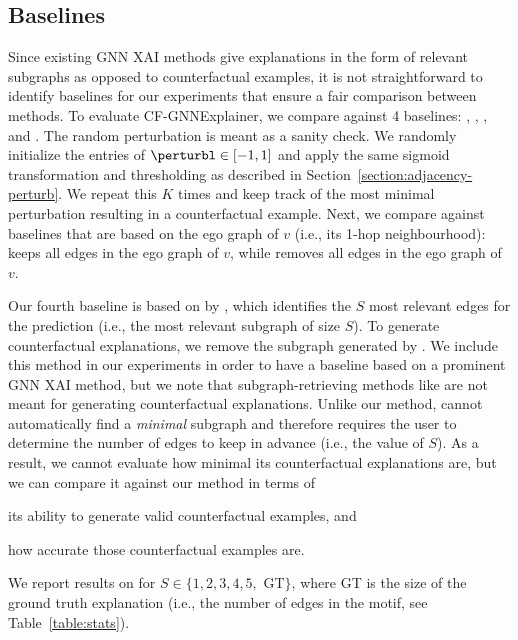 \subsection{Baselines}
\label{section:baselines}
Since existing GNN XAI methods give explanations in the form of relevant subgraphs as opposed to counterfactual examples, it is not straightforward to identify baselines for our experiments that ensure a fair comparison between methods. 
To evaluate CF-GNNExplainer, we compare against 4 baselines: \baserand{}, \basekeep{}, \baserm{}, and \gnnexplainer{}.
The random perturbation is meant as a sanity check. 
We randomly initialize the entries of $\perturbl \in \left[-1, 1\right]$ and apply the same sigmoid transformation and thresholding as described in Section~\ref{section:adjacency-perturb}. 
We repeat this $K$ times and keep track of the most minimal perturbation resulting in a counterfactual example. 
Next, we compare against baselines that are based on the ego graph of $v$ (i.e., its 1-hop neighbourhood): \basekeep{} keeps all edges in the ego graph of $v$, while \baserm{} removes all edges in the ego graph of $v$. 

Our fourth baseline is based on \gnnexplainer{} by \citet{ying_gnnexplainer_2019}, which identifies the $S$ most relevant edges for the prediction (i.e., the most relevant subgraph of size $S$). 
To generate counterfactual explanations, we remove the subgraph generated by \gnnexplainer{}. 
We include this method in our experiments in order to have a baseline based on a prominent GNN XAI method, but we note that subgraph-retrieving methods like \gnnexplainer{} are not meant for generating counterfactual explanations. 
Unlike our method, \gnnexplainer{} cannot automatically find a \emph{minimal} subgraph and therefore requires the user to determine the number of edges to keep in advance (i.e., the value of $S$). 
As a result, we cannot evaluate how minimal its counterfactual explanations are, but we can compare it against our method in terms of 
\begin{inparaenum}[(i)]
	\item its ability to generate valid counterfactual examples, and 
	\item how accurate those counterfactual examples are.
\end{inparaenum}
We report results on \gnnexplainer{} for $ S \in \{1, 2, 3, 4, 5,$ GT$\}$, where GT is the size of the ground truth explanation (i.e., the number of edges in the motif, see Table~\ref{table:stats}). 




